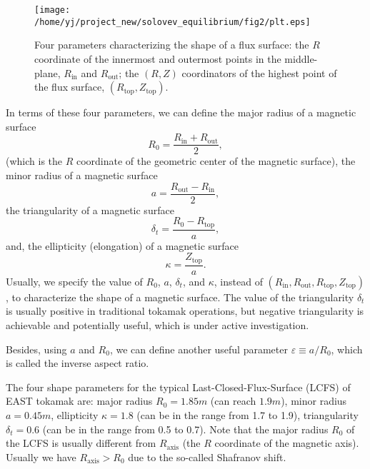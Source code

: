 \documentclass{llncs}
\newcommand{\tmop}[1]{\ensuremath{\operatorname{#1}}}
\begin{document}
\begin{figure}[h]
  \texttt{[image: /home/yj/project\_new/solovev\_equilibrium/fig2/plt.eps]}
  \caption{\label{8-9-p1}Four parameters characterizing the shape of a flux
  surface: the $R$ coordinate of the innermost and outermost points in the
  middle-plane, $R_{\tmop{in}}$ and $R_{\tmop{out}}$; the $(R, Z)$
  coordinators of the highest point of the flux surface, $(R_{\tmop{top}},
  Z_{\tmop{top}})$.}
\end{figure}

In terms of these four parameters, we can define the major radius of a
magnetic surface
\begin{equation}
  \label{4-25-p1} R_0 = \frac{R_{\tmop{in}} + R_{\tmop{out}}}{2},
\end{equation}
(which is the $R$ coordinate of the geometric center of the magnetic surface),
the minor radius of a magnetic surface
\begin{equation}
  \label{4-25-p2} a = \frac{R_{\tmop{out}} - R_{\tmop{in}}}{2},
\end{equation}
the triangularity of a magnetic surface
\begin{equation}
  \label{4-25-p3} \delta_t = \frac{R_0 - R_{\tmop{top}}}{a},
\end{equation}
and, the ellipticity (elongation) of a magnetic surface
\begin{equation}
  \label{4-25-p4} \kappa = \frac{Z_{\tmop{top}}}{a} .
\end{equation}
Usually, we specify the value of $R_0$, $a$, $\delta_t$, and $\kappa$, instead
of $(R_{\tmop{in}}, R_{\tmop{out}}, R_{\tmop{top}}, Z_{\tmop{top}})$, to
characterize the shape of a magnetic surface. The value of the triangularity
$\delta_t$ is usually positive in traditional tokamak operations, but negative
triangularity is achievable and potentially useful, which is under active
investigation.

Besides, using $a$ and $R_0$, we can define another useful parameter
$\varepsilon \equiv a / R_0$, which is called the inverse aspect ratio.

The four shape parameters for the typical Last-Closed-Flux-Surface (LCFS) of
EAST tokamak are: major radius $R_0 = 1.85 m$ (can reach $1.9 m$), minor
radius $a = 0.45 m$, ellipticity $\kappa = 1.8$ (can be in the range from 1.7
to 1.9), triangularity $\delta_t = 0.6$ (can be in the range from 0.5 to 0.7).
Note that the major radius $R_0$ of the LCFS is usually different from
$R_{\tmop{axis}}$ (the $R$ coordinate of the magnetic axis). Usually we have
$R_{\tmop{axis}} > R_0$ due to the so-called Shafranov shift.
\end{document}
